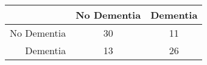 \begin{table}[ht]
\centering
\begin{tabular}{r|c|c}
  \hline
 & No Dementia & Dementia \\ 
  \hline
No Dementia & 30 & 11 \\ 
  Dementia & 13 & 26 \\ 
   \hline
\end{tabular}
\end{table}
